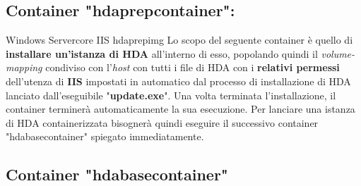 \subsection{Container "hdaprepcontainer":}

\begin{namespacedesc}
	 {Windows Servercore IIS}
	 {hdaprepimg}
	 {Lo scopo del seguente container è quello di \textbf{installare un'istanza di HDA} all'interno di esso, popolando quindi il \textit{volume-mapping} condiviso con l'\textit{host} con tutti i file di HDA con i \textbf{relativi permessi} dell'utenza di \textbf{IIS} impostati in automatico dal processo di installazione di HDA lanciato dall'eseguibile "\textbf{update.exe}".
Una volta terminata l'installazione, il container terminerà automaticamente la sua esecuzione. Per lanciare una istanza di HDA containerizzata bisognerà quindi eseguire il successivo container "hdabasecontainer" spiegato immediatamente.}
\end{namespacedesc}
\subsection{Container "hdabasecontainer"}

